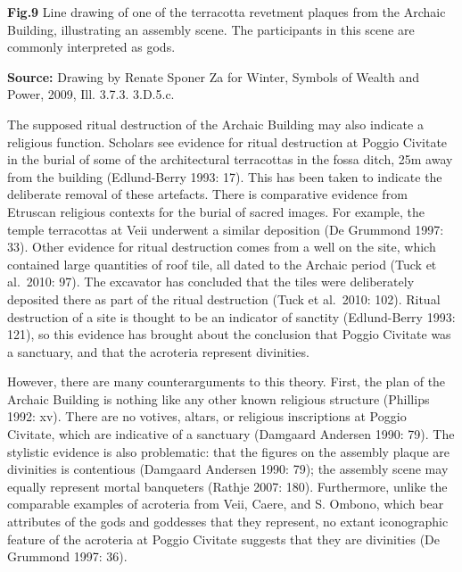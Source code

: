 \textbf{Fig.9} Line drawing of one of the terracotta revetment plaques
from the Archaic Building, illustrating an assembly scene. The
participants in this scene are commonly interpreted as gods.

\textbf{Source:} Drawing by Renate Sponer Za for Winter, Symbols of
Wealth and Power, 2009, Ill. 3.7.3. 3.D.5.c.

The supposed ritual destruction of the Archaic Building may also
indicate a religious function. Scholars see evidence for ritual
destruction at Poggio Civitate in the burial of some of the
architectural terracottas in the fossa ditch, 25m away from the building
(Edlund-Berry 1993: 17). This has been taken to indicate the deliberate
removal of these artefacts. There is comparative evidence from Etruscan
religious contexts for the burial of sacred images. For example, the
temple terracottas at Veii underwent a similar deposition (De Grummond
1997: 33). Other evidence for ritual destruction comes from a well on
the site, which contained large quantities of roof tile, all dated to
the Archaic period (Tuck et al.~2010: 97). The excavator has concluded
that the tiles were deliberately deposited there as part of the ritual
destruction (Tuck et al.~2010: 102). Ritual destruction of a site is
thought to be an indicator of sanctity (Edlund-Berry 1993: 121), so this
evidence has brought about the conclusion that Poggio Civitate was a
sanctuary, and that the acroteria represent divinities.

However, there are many counterarguments to this theory. First, the plan
of the Archaic Building is nothing like any other known religious
structure (Phillips 1992: xv). There are no votives, altars, or
religious inscriptions at Poggio Civitate, which are indicative of a
sanctuary (Damgaard Andersen 1990: 79). The stylistic evidence is also
problematic: that the figures on the assembly plaque are divinities is
contentious (Damgaard Andersen 1990: 79); the assembly scene may equally
represent mortal banqueters (Rathje 2007: 180). Furthermore, unlike the
comparable examples of acroteria from Veii, Caere, and S. Ombono, which
bear attributes of the gods and goddesses that they represent, no extant
iconographic feature of the acroteria at Poggio Civitate suggests that
they are divinities (De Grummond 1997: 36).

